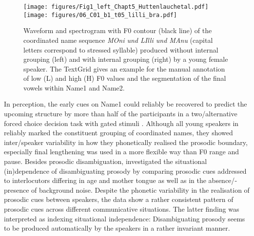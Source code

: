 \documentclass[output=paper]{langscibook}
\begin{document}
\begin{figure}
    \label{fig:nob}\texttt{[image: figures/Fig1\_left\_Chapt5\_Huttenlauchetal.pdf]}\hfill%
    \label{fig:bra}\texttt{[image: figures/06\_C01\_b1\_t05\_lilli\_bra.pdf]}
    \caption{Waveform and spectrogram with F0 contour (black line) of the coordinated name sequence \textit{MOni und LIlli und MAnu} (capital letters correspond to stressed syllable) produced without internal grouping (left) and with internal grouping (right) by a young female speaker. The TextGrid gives an example for the manual annotation of low (L) and high (H) F0 values and the segmentation of the final vowels within Name1 and Name2.}
    \label{fig:spectrogram}
\end{figure}

In perception, the early cues on Name1 could reliably be recovered to predict the upcoming structure by more than half of the participants in a two\-/alternative forced choice decision task with gated stimuli  \citep{Hansen_etal_submitted}. Although all young speakers in \citet{huttenlauchetal2021} reliably marked the constituent grouping of coordinated names, they showed inter\-/speaker variability in how they phonetically realised the prosodic boundary, especially final lengthening was used in a more flexible way than F0 range and pause. Besides prosodic disambiguation, \citet{huttenlauchetal2021} investigated the situational (in)de\-pen\-dence of disambiguating prosody by comparing prosodic cues addressed to interlocutors differing in age and mother tongue as well as in the absence\fshyp presence of background noise. Despite the phonetic variability in the realisation of prosodic cues between speakers, the data show a rather consistent pattern of prosodic cues across different communicative situations. The latter finding was interpreted as indexing situational independence: Disambiguating prosody seems to be produced automatically by the speakers in a rather invariant manner.
\end{document}
